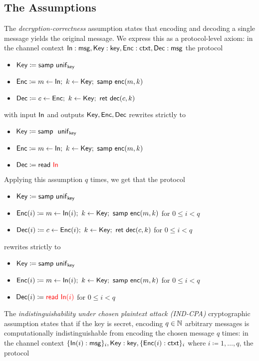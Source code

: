 \subsection{The Assumptions}
The \emph{decryption-correctness} assumption states that encoding and decoding a single message yields the original message. We express this as a protocol-level axiom: in the channel context $\mathsf{In} : \mathsf{msg}, \mathsf{Key} : \mathsf{key}, \mathsf{Enc} : \mathsf{ctxt}, \mathsf{Dec} : \mathsf{msg}$ the protocol
\begin{itemize}
\item $\mathsf{Key} \coloneqq \mathsf{samp} \ \mathsf{unif}_{\mathsf{key}}$
\item $\mathsf{Enc} \coloneqq m \leftarrow \mathsf{In}; \ k \leftarrow \mathsf{Key}; \ \mathsf{samp} \ \mathsf{enc}(m,k)$
\item $\mathsf{Dec} \coloneqq c \leftarrow \mathsf{Enc}; \ k \leftarrow \mathsf{Key}; \ \mathsf{ret} \ \mathsf{dec}(c,k)$
\end{itemize}
with input $\mathsf{In}$ and outputs $\mathsf{Key}, \mathsf{Enc}, \mathsf{Dec}$ rewrites strictly to
\begin{itemize}
\item $\Key \coloneqq \samp \ \unif_\key$
\item $\mathsf{Enc} \coloneqq m \leftarrow \mathsf{In}; \ k \leftarrow \mathsf{Key}; \ \mathsf{samp} \ \mathsf{enc}(m,k)$
\item $\mathsf{Dec} \coloneqq \mathsf{read} \ {\color{red} \mathsf{In}}$
\end{itemize}
Applying this assumption $q$ times, we get that the protocol
\begin{itemize}
\item $\mathsf{Key} \coloneqq \mathsf{samp} \ \mathsf{unif}_{\mathsf{key}}$
\item $\mathsf{Enc}(i) \coloneqq m \leftarrow \mathsf{In}(i); \ k \leftarrow \mathsf{Key}; \ \mathsf{samp} \ \mathsf{enc}(m,k)$ for $0 \leq i < q$
\item $\mathsf{Dec}(i) \coloneqq c \leftarrow \mathsf{Enc}(i); \ k \leftarrow \mathsf{Key}; \ \mathsf{ret} \ \mathsf{dec}(c,k)$ for $0 \leq i < q$
\end{itemize}
rewrites strictly to
\begin{itemize}
\item $\mathsf{Key} \coloneqq \mathsf{samp} \ \mathsf{unif}_{\mathsf{key}}$
\item $\mathsf{Enc}(i) \coloneqq m \leftarrow \mathsf{In}(i); \ k \leftarrow \mathsf{Key}; \ \mathsf{samp} \ \mathsf{enc}(m,k)$ for $0 \leq i < q$
\item $\mathsf{Dec}(i) \coloneqq {\color{red} \mathsf{read} \ \mathsf{In}(i)}$ for $0 \leq i < q$
\end{itemize}
The \emph{indistinguishability under chosen plaintext attack (IND-CPA)} cryptographic assumption states that if the key is secret, encoding $q \in \mathbb{N}$ arbitrary messages is computationally indistinguishable from encoding the chosen message $q$ times: in the channel context $\{\mathsf{In}(i) : \mathsf{msg}\}_i, \mathsf{Key} : \mathsf{key}, \{\mathsf{Enc}(i) : \mathsf{ctxt}\}_i$ where $i \coloneqq 1,\dots,q$, the protocol
